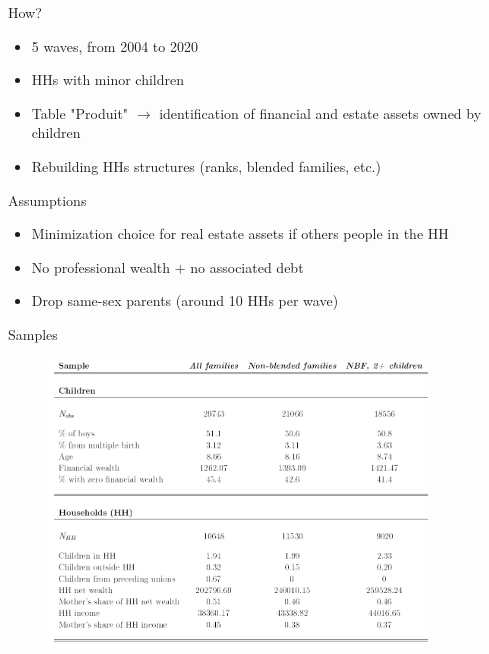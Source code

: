\documentclass[xolor = dvipsnames, compress]{beamer} %
\begin{document}

\begin{frame}[label = how]{How?}    
	\begin{itemize}\setlength{\itemsep}{15pt}
		\item 5 waves, from 2004 to 2020
		\item HHs with minor children
		\item Table "Produit" $\rightarrow$ identification of financial and estate assets owned by children
		\item Rebuilding HHs structures (ranks, blended families, etc.)
	\end{itemize}
\end{frame}


\begin{frame}[label = assumptions]{Assumptions}    
	\begin{itemize}\setlength{\itemsep}{15pt}
		\item Minimization choice for real estate assets if others people in the HH
		\item No professional wealth + no associated debt
		\item Drop same-sex parents (around 10 HHs per wave)
	\end{itemize}
\end{frame}



\begin{frame}[label = samples]{Samples}    
	\begin{figure}[h]
		\centering
		\includegraphics[width = 0.9\textwidth, height = 0.9\textheight, keepaspectratio]{samples.png}
	\end{figure}
\end{frame}
\end{document}

